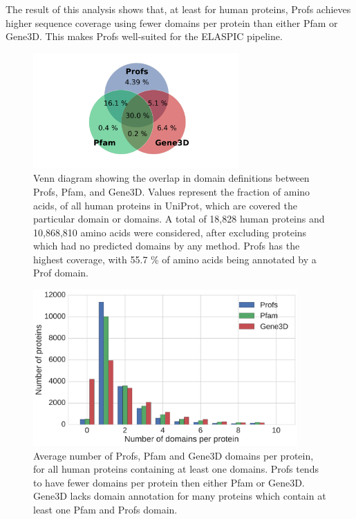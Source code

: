 The result of this analysis shows that, at least for human proteins, Profs achieves higher sequence coverage using fewer domains per protein than either Pfam or Gene3D. This makes Profs well-suited for the ELASPIC pipeline.


\begin{figure}[t]
	\centering
	\includegraphics[width=0.7\textwidth]{static/profs/uniprot_coverage_statistics.pdf}
	\caption[Venn diagram showing the overlap in domain definitions between Profs, Pfam, and Gene3D.]{Venn diagram showing the overlap in domain definitions between Profs, Pfam, and Gene3D. Values represent the fraction of amino acids, of all human proteins in UniProt, which are covered the particular domain or domains. A total of 18,828 human proteins and 10,868,810 amino acids were considered, after excluding proteins which had no predicted domains by any method. Profs has the highest coverage, with 55.7 \% of amino acids being annotated by a Prof domain.}
	\label{fig:profs_coverage}
\end{figure}


\begin{figure}[t]
	\centering
	\includegraphics[width=0.9\textwidth]{static/profs/domains_per_protein.pdf}
	\caption[Average number of Profs, Pfam and Gene3D domains per protein]{Average number of Profs, Pfam and Gene3D domains per protein, for all human proteins containing at least one domains. Profs tends to have fewer domains per protein then either Pfam or Gene3D. Gene3D lacks domain annotation for many proteins which contain at least one Pfam and Profs domain.}
	\label{fig:profs_domain_size}
\end{figure}



